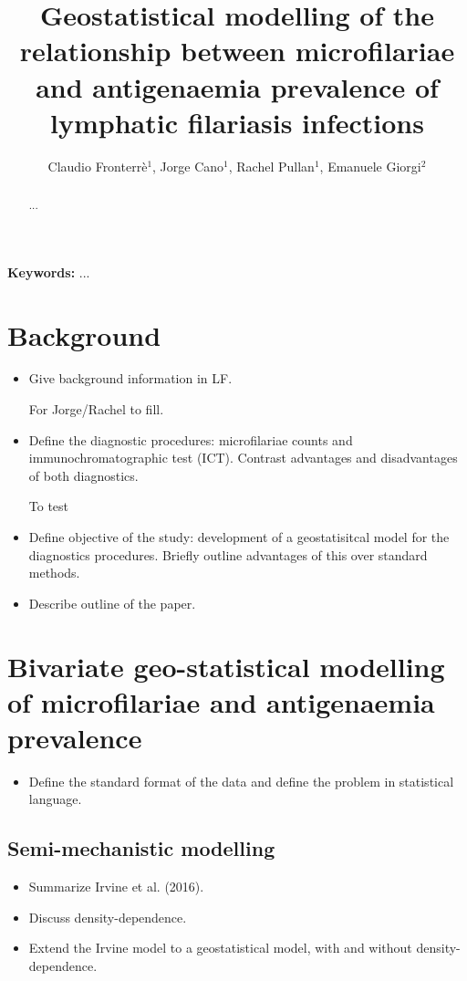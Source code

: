 \documentclass[12pt,a4paper]{article}
\title{Geostatistical modelling of the relationship between microfilariae and antigenaemia prevalence of lymphatic filariasis infections}
\author{Claudio Fronterr\`e$^1$, Jorge Cano$^1$, Rachel Pullan$^1$,  Emanuele Giorgi$^2$}
\begin{document}
\maketitle
\begin{abstract}
...
\end{abstract}
\textbf{Keywords:} ...

\section{Background}
\label{sec:background}
\begin{itemize}
\item Give background information in LF.

For Jorge/Rachel to fill.

\item Define the diagnostic procedures: microfilariae counts and immunochromatographic test (ICT). Contrast advantages and disadvantages of both diagnostics. 

To test 

\item Define objective of the study: development of a geostatisitcal model for the diagnostics procedures. Briefly outline advantages of this over standard methods. 
\item Describe outline of the paper.
\end{itemize}

\section{Bivariate geo-statistical modelling of microfilariae and antigenaemia prevalence}
\label{sec:biv_model}
\begin{itemize}
\item Define the standard format of the data and define the problem in statistical language. 
\end{itemize}

\subsection{Semi-mechanistic modelling}
\label{subsec:semi_mech}
\begin{itemize}
\item Summarize Irvine et al. (2016). 
\item Discuss density-dependence.
\item Extend the Irvine model to a geostatistical model, with and without density-dependence.
\end{itemize}
\end{document}
